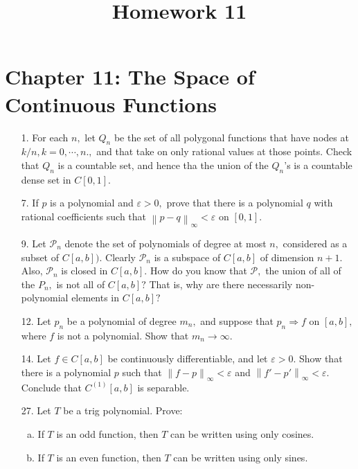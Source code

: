 \documentclass{article}
\begin{document}
\title{Homework 11}
\maketitle
\thispagestyle{fancy}

\section*{Chapter 11: The Space of Continuous Functions}

\begin{itemize}
	\item[1.] For each $n,$ let $Q_n$ be the set of all polygonal functions that have nodes at $k/n, k=0, \cdots, n.,$ and that take on only rational values at those points. Check that $Q_n$ is a countable set, and hence tha the union of the $Q_n$'s is a countable dense set in $C[0, 1].$

	\item[7.] If $p$ is a polynomial and $\varepsilon>0,$ prove that there is a polynomial $q$ with rational coefficients such that $\left\lVert p-q \right\rVert_\infty<\varepsilon$ on $[0, 1].$

	\item[9.] Let $\mathcal P_n$ denote the set of polynomials of degree at most $n,$ considered as a subset of $C[a, b]).$ Clearly $\mathcal P_n$ is a subspace of $C[a, b]$ of dimension $n+1.$ Also, $\mathcal P_n$ is closed in $C[a, b].$ How do you know that $\mathcal P,$ the union of all of the $P_n,$ is not all of $C[a, b]?$ That is, why are there necessarily non-polynomial elements in $C[a, b]?$

	\item[12.] Let $p_n$ be a polynomial of degree $m_n,$ and suppose that $p_n\Rightarrow f$ on $[a, b],$ where $f$ is not a polynomial. Show that $m_n\to \infty.$

	\item[14.] Let $f\in C[a, b]$ be continuously differentiable, and let $\varepsilon>0.$ Show that there is a polynomial $p$ such that $\left\lVert f-p \right\rVert_\infty<\varepsilon$ and $\left\lVert f'-p' \right\rVert_\infty<\varepsilon.$ Conclude that $C^{(1)}[a, b]$ is separable.

	\item[27.] Let $T$ be a trig polynomial. Prove:
		\begin{enumerate}[(a)]
			\item If $T$ is an odd function, then $T$ can be written using only cosines.

			\item If $T$ is an even function, then $T$ can be written using only sines.
				
		\end{enumerate}
		
\end{itemize}
\end{document}
